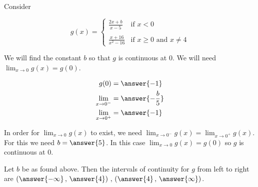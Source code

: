 \documentclass{ximera}
\author{Nela Lakos \and Kyle Parsons}
\begin{document}
\begin{exercise}

Consider

\[
g(x) = 
\begin{cases}
\frac{2x+b}{x-5} & \text{if }x<0\\ \\
\frac{x+16}{x^2-16} & \text{if }x\geq0\text{ and }x\neq4
\end{cases}
\]

We will find the constant $b$ so that $g$ is continuous at 0.  We will need $\lim_{x\to0}g(x) = g(0)$.  

\begin{align*}
g(0) &= \answer{-1}\\
\lim_{x\to0^-} &= \answer{-\frac{b}{5}}\\
\lim_{x\to0^+} &= \answer{-1}
\end{align*}

\begin{exercise}

In order for $\lim_{x\to0}g(x)$ to exist, we need $\lim_{x\to0^-}g(x) = \lim_{x\to0^+}g(x)$. For this we need $b = \answer{5}$.  In this case $\lim_{x\to0}g(x) = g(0)$ so $g$ is continuous at 0.

\begin{exercise}

Let $b$ be as found above.  Then the intervals of continuity for $g$ from left to right are $\left(\answer{-\infty}\, , \,\answer{4}\right)\, , \,\left(\answer{4}\, ,\,\answer{\infty}\right)$.

\end{exercise}
\end{exercise}
\end{exercise}
\end{document}
